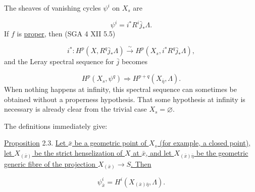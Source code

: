\begin{center}
\end{center}
The sheaves of vanishing cycles $\psi^i$ on $X_s$ are

\begin{equation*}\tag{2.2.1}
\psi^i=i^*R^i\bar j_*\Lambda.
\end{equation*}
If $f$ is \underline{proper}, then (SGA 4 XII 5.5)

\begin{equation*}\tag{2.2.2}
i^*:H^p(X,R^q\bar j_*\Lambda)\xrightarrow{\ \sim\ }
H^p(X_s,i^*R^q\bar j_*\Lambda),
\end{equation*}
and the Leray spectral sequence for $\bar j$ becomes

\begin{equation*}\tag{2.2.3}
H^p(X_s,\psi^q)\Longrightarrow H^{p+q}(X_{\bar\eta},\Lambda).
\end{equation*}
When nothing happens at infinity, this spectral sequence can sometimes be obtained without a properness hypothesis. That some hypothesis at infinity is necessary is already clear from the trivial case $X_s=\varnothing$.


The definitions immediately give:

\underline{Proposition} 2.3. \underline{Let $\bar x$ be a geometric point of $X_s$ (for example, a closed point), let $X_{(\bar x)}$ be the strict henselization of $X$ at $\bar x$, and let $X_{(\bar x)\bar\eta}$ be the geometric generic fibre of the projection $X_{(\bar x)}\longrightarrow S$. Then}

\begin{equation*}
\psi^i_{\bar x}=H^i(X_{(\bar x)\bar\eta},\Lambda).
\end{equation*}


